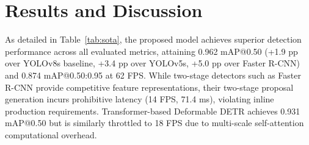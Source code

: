\documentclass{llncs}
\begin{document}
\section{Results and Discussion}
As detailed in Table~\ref{tab:sota}, the proposed model achieves superior detection performance across all evaluated metrics, attaining 0.962 mAP@0.50 (+1.9 pp over YOLOv8s baseline, +3.4 pp over YOLOv5s, +5.0 pp over Faster R-CNN) and 0.874 mAP@0.50:0.95 at 62 FPS. While two-stage detectors such as Faster R-CNN \cite{ren2015fasterrcnn} provide competitive feature representations, their two-stage proposal generation incurs prohibitive latency (14 FPS, 71.4 ms), violating inline production requirements. Transformer-based Deformable DETR \cite{zhu2021deformable} achieves 0.931 mAP@0.50 but is similarly throttled to 18 FPS due to multi-scale self-attention computational overhead.

\begin{table}[!htbp]
\centering
\caption{Comprehensive Benchmark on the DeepPCB Test Set. FPS evaluated at batch size 1 on an NVIDIA RTX 3060. Bold denotes best result.}
\label{tab:sota}
\end{table}
\end{document}
